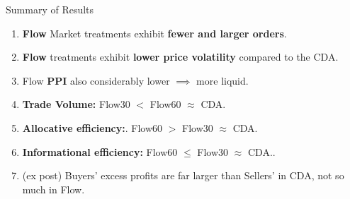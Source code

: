 \documentclass[10pt]{beamer}
\begin{document}
\begin{frame}{Summary of Results}

\begin{enumerate}
    \item[R1:] \textbf{Flow} Market treatments exhibit \textbf{fewer and larger orders}.  \pause 

    
    \item[R2:] \textbf{Flow} treatments exhibit \textbf{lower price volatility} compared to the CDA.\\  \pause 
   
     \item[R3:] Flow \textbf{PPI} also considerably lower $\implies$ more liquid. \\  \pause 
    \vspace{0.5cm}
    
    \item[R4:] \textbf{Trade Volume:} Flow30 $<$ Flow60 $\approx$ CDA.  \pause 
    
    \item[R5a:] \textbf{Allocative efficiency:}. Flow60 $>$ Flow30 $\approx$ CDA.
    \item[R5b:] \textbf{Informational efficiency:} Flow60 $\leq$ Flow30 $\approx$ CDA..
    \pause 
  \vspace{0.5cm}
    \item[R6:] (ex post) Buyers' excess profits are far larger than Sellers' in CDA, not so much in Flow. 
    
\end{enumerate}



\end{frame}
\end{document}

